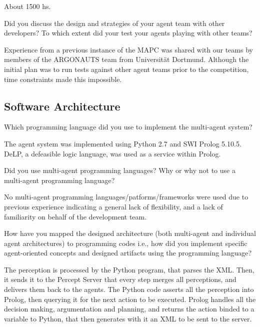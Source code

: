 
About 1500 hs.

\begin{question}
Did you discuss the design and strategies of your agent team with other
developers? To which extent did your test your agents playing with other
teams?  
\end{question}

Experience from a previous instance of the MAPC was shared with our
teams by members of the ARGONAUTS team from Universität Dortmund. Although the
initial plan was to run tests against other agent teams prior to the
competition, time constraints made this impossible.

\subsection{Software Architecture}

\begin{question}
Which programming language did you use to
implement the multi-agent system?  
\end{question}

The agent system was implemented using
Python 2.7 and SWI Prolog 5.10.5. DeLP, a defeasible logic language, was used
as a service within Prolog.

\begin{question}
Did you use multi-agent programming languages? Why or why not to use a
multi-agent programming language?  
\end{question}

No multi-agent programming
languages/patforms/frameworks were used due to previous experience indicating
a general lack of flexibility, and a lack of familiarity on behalf of the
development team.

\begin{question}
How have you mapped the designed architecture (both multi-agent and
individual agent architectures) to programming codes i.e., how did you
implement specific agent-oriented concepts and designed artifacts using the
programming language?  
\end{question}

The perception is processed by the Python program, that
parses the XML. Then, it sends it to the Percept Server that every step merges
all perceptions, and delivers them back to the agents.  The Python code
asserts all the perception into Prolog, then querying it for the next action
to be executed.  Prolog handles all the decision making, argumentation and
planning, and returns the action binded to a variable to Python, that then
generates with it an XML to be sent to the server.

